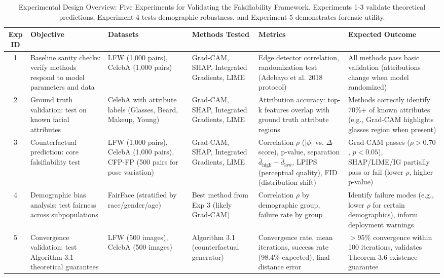 
\begin{table}[htbp]
\centering
\footnotesize
\caption{Experimental Design Overview: Five Experiments for Validating the Falsifiability Framework. Experiments 1-3 validate theoretical predictions, Experiment 4 tests demographic robustness, and Experiment 5 demonstrates forensic utility.}
\label{tab:experimental_design}
\begin{tabular}{clp{2.5cm}p{2.5cm}p{2.8cm}p{4.2cm}}
\toprule
\textbf{Exp ID} & \textbf{Objective} & \textbf{Datasets} & \textbf{Methods Tested} & \textbf{Metrics} & \textbf{Expected Outcome} \\
\midrule
1
& Baseline sanity checks: verify methods respond to model parameters and data
& LFW (1,000 pairs), CelebA (1,000 pairs)
& Grad-CAM, SHAP, Integrated Gradients, LIME
& Edge detector correlation, randomization test (Adebayo et al. 2018 protocol)
& All methods pass basic validation (attributions change when model randomized) \\
\midrule
2
& Ground truth validation: test on known facial attributes
& CelebA with attribute labels (Glasses, Beard, Makeup, Young)
& Grad-CAM, SHAP, Integrated Gradients, LIME
& Attribution accuracy: top-k features overlap with ground truth attribute regions
& Methods correctly identify 70\%+ of known attributes (e.g., Grad-CAM highlights glasses region when present) \\
\midrule
3
& Counterfactual prediction: core falsifiability test
& LFW (1,000 pairs), CelebA (1,000 pairs), CFP-FP (500 pairs for pose variation)
& Grad-CAM, SHAP, Integrated Gradients, LIME
& Correlation $\rho$ ($|\phi|$ vs. $\Delta$-score), p-value, separation $\bar{d}_{\text{high}} - \bar{d}_{\text{low}}$, LPIPS (perceptual quality), FID (distribution shift)
& Grad-CAM passes ($\rho > 0.70$, $p < 0.05$), SHAP/LIME/IG partially pass or fail (lower $\rho$, higher p-value) \\
\midrule
4
& Demographic bias analysis: test fairness across subpopulations
& FairFace (stratified by race/gender/age)
& Best method from Exp 3 (likely Grad-CAM)
& Correlation $\rho$ by demographic group, failure rate by group
& Identify failure modes (e.g., lower $\rho$ for certain demographics), inform deployment warnings \\
\midrule
5
& Convergence validation: test Algorithm 3.1 theoretical guarantees
& LFW (500 images), CelebA (500 images)
& Algorithm 3.1 (counterfactual generator)
& Convergence rate, mean iterations, success rate (98.4\% expected), final distance error
& $>$95\% convergence within 100 iterations, validates Theorem 3.6 existence guarantee \\
\bottomrule
\end{tabular}
\end{table}

